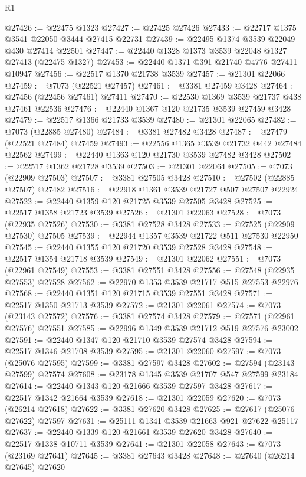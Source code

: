 \begin{lexlean}{R1}
\begin{coremodule}
@27426 := @22475 @1323
@27427 := @27425 @27426
@27433 := @22717 @1375 @3541 @22050 @3444 @27415 @22731
@27439 := @22495 @1374 @3539 @22049 @430 @27414 @22501
@27447 := @22440 @1328 @1373 @3539 @22048 @1327 @27413 (@22475 @1327)
@27453 := @22440 @1371 @391 @21740 @4776 @27411 @10947
@27456 := @22517 @1370 @21738 @3539
@27457 := @21301 @22066
@27459 := @7073 (@22521 @27457)
@27461 := @3381 @27459 @3428
@27464 := @27456 (@22456 @27461) @27411
@27470 := @22530 @1369 @3539 @21737 @438 @27461 @22536
@27476 := @22440 @1367 @120 @21735 @3539 @27459 @3428
@27479 := @22517 @1366 @21733 @3539
@27480 := @21301 @22065
@27482 := @7073 (@22885 @27480)
@27484 := @3381 @27482 @3428
@27487 := @27479 (@22521 @27484) @27459
@27493 := @22556 @1365 @3539 @21732 @442 @27484 @22562
@27499 := @22440 @1363 @120 @21730 @3539 @27482 @3428
@27502 := @22517 @1362 @21728 @3539
@27503 := @21301 @22064
@27505 := @7073 (@22909 @27503)
@27507 := @3381 @27505 @3428
@27510 := @27502 (@22885 @27507) @27482
@27516 := @22918 @1361 @3539 @21727 @507 @27507 @22924
@27522 := @22440 @1359 @120 @21725 @3539 @27505 @3428
@27525 := @22517 @1358 @21723 @3539
@27526 := @21301 @22063
@27528 := @7073 (@22935 @27526)
@27530 := @3381 @27528 @3428
@27533 := @27525 (@22909 @27530) @27505
@27539 := @22944 @1357 @3539 @21722 @511 @27530 @22950
@27545 := @22440 @1355 @120 @21720 @3539 @27528 @3428
@27548 := @22517 @1354 @21718 @3539
@27549 := @21301 @22062
@27551 := @7073 (@22961 @27549)
@27553 := @3381 @27551 @3428
@27556 := @27548 (@22935 @27553) @27528
@27562 := @22970 @1353 @3539 @21717 @515 @27553 @22976
@27568 := @22440 @1351 @120 @21715 @3539 @27551 @3428
@27571 := @22517 @1350 @21713 @3539
@27572 := @21301 @22061
@27574 := @7073 (@23143 @27572)
@27576 := @3381 @27574 @3428
@27579 := @27571 (@22961 @27576) @27551
@27585 := @22996 @1349 @3539 @21712 @519 @27576 @23002
@27591 := @22440 @1347 @120 @21710 @3539 @27574 @3428
@27594 := @22517 @1346 @21708 @3539
@27595 := @21301 @22060
@27597 := @7073 (@25076 @27595)
@27599 := @3381 @27597 @3428
@27602 := @27594 (@23143 @27599) @27574
@27608 := @23178 @1345 @3539 @21707 @547 @27599 @23184
@27614 := @22440 @1343 @120 @21666 @3539 @27597 @3428
@27617 := @22517 @1342 @21664 @3539
@27618 := @21301 @22059
@27620 := @7073 (@26214 @27618)
@27622 := @3381 @27620 @3428
@27625 := @27617 (@25076 @27622) @27597
@27631 := @25111 @1341 @3539 @21663 @921 @27622 @25117
@27637 := @22440 @1339 @120 @21661 @3539 @27620 @3428
@27640 := @22517 @1338 @10711 @3539
@27641 := @21301 @22058
@27643 := @7073 (@23169 @27641)
@27645 := @3381 @27643 @3428
@27648 := @27640 (@26214 @27645) @27620

\end{coremodule}
\end{lexlean}
